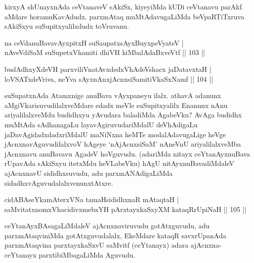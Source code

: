 \begin{artha}
kirxyA shUnayxnAda ceVtanaveV sAkiSx, kiyeyiMda kUDi ceVtanavu parAkf. aMdare horamuKavAdudx. parxmAtaq muMtAdavugaLiMda beVpaRTiTxruva sAkiSxyu suSupitxyalilxdudx toVruvanu.
\end{artha}


\begin{shl}
na ceVdanuBavavAyxpitxH suSaupatxsAyxBuyxpeVyateV |\\
nAveVdiSaM suSupetxV\s hamiti dhiVH kiMbalAdaBxveVtf \hfill || 103 ||
\end{shl}

\begin{shl}
budAdhxyXdeVH parxviliVnatAvxdedxVhAdeVshacx jaDatavxtaH |\\
loVSATxdeVriva, neYva sAyxnAnxjAcnxsiSamitiVkaSxNamf \hfill || 104 ||
\end{shl}

\begin{artha}
suSupatxnAda Atamxnige anuBava vAyxpaneyu ilalx. athavA adanunx aMgiVkarisuvudilalxveMdare edadx meVle suSupitxyalilx Enanunx nAnu ariyalilalxveMdu budidhxyu yAvudara baladiMda AgabeVku? AvAga budidhx muMtAda sAdhanagaLu layavAgiruvudariMdalU deVhAdigaLu jaDavAgidadxdadxriMdalU maNiNxna heMTe modalAdavugaLige heVge jAcnxnavAguvudilalxvoV hAgeye `nAjAcnxsiSaM' nAneVnU ariyalilalxveMba jAcnxnavu anuBavavu AgadeV hoVguvudu. (adariMda nitayx ceYtanAyxnuBava rUpavAda sAkiSxyu itetxMdu heVLabeVku) hAgU nitAyxnuBavadiMdaleV ajAcnxnavU sididhxsuvudu, adu parxmANAdigaLiMda sidadhxvAguvudalalxvenunxtAtxre.
\end{artha}

\begin{shl}
cidABAseYkamAterxVNa tamaHsididhxnaR mAtaqtaH |\\
saMvitatxnomxVhacidivxmebxYH pArxtayxkaSxyXM kataqRrUpiNaH \hfill || 105 ||
\end{shl}

\begin{artha}
ceYtanAyxBAsagaLiMdaleV ajAcnxnaviruvudu gotAtxguvudu, adu parxmAtaqviniMda gotAtxguvudalalx, EkeMdare kataqR savxrUpanAda parxmAtaqvina parxtayxkaSxvU saMvitf (ceYtanayx) adara ajAcnxna- ceYtanayx parxtibiMbagaLiMda Aguvudu.
\end{artha}


